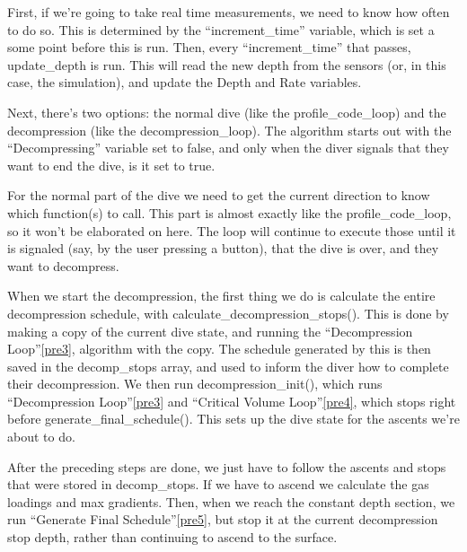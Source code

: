 \documentclass[12pt]{article}
\begin{document}
First, if we're going to take real time measurements, we need to know how often to do so. This is
determined by the ``increment\_time'' variable, which is set a some point before this is run.
Then, every ``increment\_time'' that passes, update\_depth is run. This will read the new depth
from the sensors (or, in this case, the simulation), and update the Depth and Rate variables.

Next, there's two options: the normal dive (like the profile\_code\_loop) and the decompression (like
the decompression\_loop). The algorithm starts out with the ``Decompressing'' variable set to false,
and only when the diver signals that they want to end the dive, is it set to true.

For the normal part of the dive we need to get the current direction to know which function(s)
to call. This part is almost exactly like the profile\_code\_loop, so it won't be elaborated on here. The loop
will continue to execute those until it is signaled (say, by the user pressing a button), that the
dive is over, and they want to decompress.

When we start the decompression, the first thing we do is calculate the entire decompression schedule, with calculate\_decompression\_stops().
This is done by making a copy of the current dive state, and running the ``Decompression Loop''\ref{pre3},
algorithm with the copy. The schedule generated by this is then saved in the decomp\_stops array,
and used to inform the diver how to complete their decompression. We then run decompression\_init(), which
runs ``Decompression Loop''\ref{pre3} and ``Critical Volume Loop''\ref{pre4}, which stops right before
generate\_final\_schedule(). This sets up the dive state for the ascents we're about to do.

After the preceding steps are done, we just have to follow the ascents and stops that were
stored in decomp\_stops. If we have to ascend we calculate the gas loadings and max gradients.
Then, when we reach the constant depth section, we run ``Generate Final Schedule''\ref{pre5}, but stop
it at the current decompression stop depth, rather than continuing to ascend to the surface.
\end{document}
